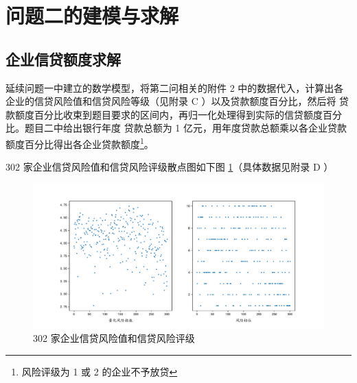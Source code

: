 \documentclass[withoutpreface,bwprint]{cumcmthesis}
\begin{document}
    \section{问题二的建模与求解}
    \subsection{企业信贷额度求解}
        延续问题一中建立的数学模型，将第二问相关的附件 2 中的数据代入，计算出各企业的信贷风险值和信贷风险等级（见附录 C ）以及贷款额度百分比，然后将
        贷款额度百分比收束到题目要求的区间内，再归一化处理得到实际的信贷额度百分比。题目二中给出银行年度
        贷款总额为 1 亿元，用年度贷款总额乘以各企业贷款额度百分比得出各企业贷款额度\footnote{风险评级为 1 或 2 的企业不予放贷}。\par
        302 家企业信贷风险值和信贷风险评级散点图如下图 \ref{图：2-1}（具体数据见附录 D ）
        \begin{figure}[H]
            \centering
            \includegraphics[width = 1.0\textwidth]{2_1.pdf}
            \caption{302 家企业信贷风险值和信贷风险评级}
            \label {图：2-1}
        \end{figure}
\end{document}
